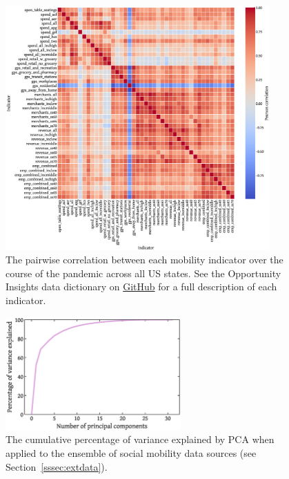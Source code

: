 \documentclass[dvipsnames]{article}
\newcommand{\ExternalLink}{%
    \tikz[x=1.2ex, y=1.2ex, baseline=-0.05ex]{%
        \begin{scope}[x=1ex, y=1ex]
            \clip (-0.1,-0.1) 
                --++ (-0, 1.2) 
                --++ (0.6, 0) 
                --++ (0, -0.6) 
                --++ (0.6, 0) 
                --++ (0, -1);
            \path[draw, 
                line width = 0.5, 
                rounded corners=0.5] 
                (0,0) rectangle (1,1);
        \end{scope}
        \path[draw, line width = 0.5] (0.5, 0.5) 
            -- (1, 1);
        \path[draw, line width = 0.5] (0.6, 1) 
            -- (1, 1) -- (1, 0.6);
            }
    }
\begin{document}
\begin{figure}
    \centering
    \includegraphics[width=0.9\textwidth]{corr_raw_indicators.eps}
    \caption{The pairwise correlation between each mobility indicator over the course of the pandemic across all US states. See the Opportunity Insights data dictionary on \href{https://github.com/OpportunityInsights/EconomicTracker/blob/main/docs/oi_tracker_data_dictionary.md}{GitHub} for a full description of each indicator.} %
    \label{fig:corr_raw_indicators}
\end{figure}

\begin{figure}
    \centering
    \includegraphics[width=0.6\textwidth]{cumulative_variance.eps}
    \caption{The cumulative percentage of variance explained by PCA when applied to the ensemble of social mobility data sources (see Section~\ref{sssec:extdata}).}
    \label{fig:cumulative_variance}
\end{figure}
\end{document}
